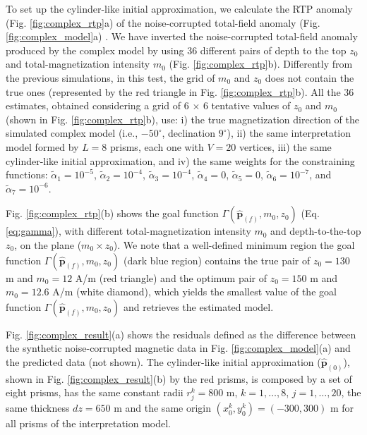To set up the cylinder-like initial approximation, we calculate the RTP anomaly (Fig. \ref{fig:complex_rtp}a) of the noise-corrupted total-field anomaly 
(Fig. \ref{fig:complex_model}a) .
We have inverted the noise-corrupted total-field anomaly produced by the complex model by using 36 different pairs of depth to the top $ z_0 $ and total-magnetization intensity 
$ m_0 $ (Fig. \ref{fig:complex_rtp}b). 
Differently from the previous simulations, in this test, the grid of $ m_0 $ and $ z_0 $ 
does not contain the true ones (represented by the red triangle in Fig. \ref{fig:complex_rtp}b). 
All the $ 36 $ estimates, obtained considering a grid of 6 $\times$ 6 tentative values of $z_0$ and $m_0$ (shown in Fig. \ref{fig:complex_rtp}b), use: i) the true magnetization direction of the simulated complex model (i.e., $ -50^\circ $, declination $ 9^\circ $), ii) the same interpretation model formed by $ L = 8 $ prisms, each one with $ V = 20 $ vertices, iii) the same cylinder-like initial approximation, and iv) the same weights for the constraining functions: 
$\tilde{\alpha}_1 = 10^{-5}$, 
$\tilde{\alpha}_2 = 10^{-4}$, 
$\tilde{\alpha}_3 = 10^{-4}$, 
$\tilde{\alpha}_4 = 0$, 
$\tilde{\alpha}_5 = 0$, 
$\tilde{\alpha}_6 = 10^{-7}$, and 
$\tilde{\alpha}_7 = 10^{-6}$. 

Fig. \ref{fig:complex_rtp}(b) shows the goal function $\Gamma (\hat{\mathbf{p}}_{(f)}, m_{0}, z_{0})$ (Eq. \ref{eq:gamma}), with different total-magnetization intensity $ m_0 $ and depth-to-the-top $z_0$, on the plane ($ m_0 \times z_0 $). 
We note that a well-defined minimum region the goal function $\Gamma (\hat{\mathbf{p}}_{(f)}, m_{0}, z_{0})$ (dark blue region) contains the true pair of $z_0 = 130$ m and $m_0 = 12 $ A/m (red triangle) and the optimum pair of 
$z_0 = 150$ m and $m_0 = 12.6 $ A/m (white diamond), which yields the smallest value of the goal function $\Gamma (\hat{\mathbf{p}}_{(f)}, m_{0}, z_{0})$ and 
retrieves the estimated model.


Fig. \ref{fig:complex_result}(a) shows the residuals defined as the difference
between the synthetic noise-corrupted magnetic data in Fig. \ref{fig:complex_model}(a) 
and the predicted data (not shown).
The cylinder-like initial approximation ($ \hat{\mathbf{p}}_{(0)} $), shown 
in Fig. \ref{fig:complex_result}(b) by the red prisms, is composed by a set of eight prisms, has the same constant radii $ r^k_j = 800 $ m, $ k = 1, \dots, 8 $, $ j = 1, \dots, 20 $, 
the same thickness $ dz = 650 $ m and the same origin 
$ (x^k_0, y^k_0) = (-300, 300) $ m for all prisms of the interpretation model.

